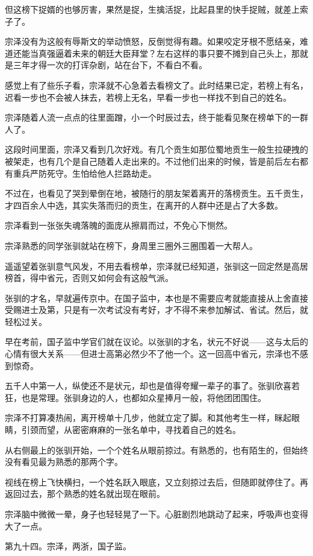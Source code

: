 但这榜下捉婿的也够厉害，果然是捉，生擒活捉，比起县里的快手捉贼，就差上索子了。

宗泽没有为这般有辱斯文的举动愤怒，反倒觉得有趣。如果咬定牙根不愿结亲，难道还能当真强逼着未来的朝廷大臣拜堂？左右这样的事只要不摊到自己头上，那就是三年才得一次的打诨杂剧，站在台下，不看白不看。

感觉上有了些乐子看，宗泽就不心急着去看榜文了。此时结果已定，若榜上有名，迟看一步也不会被人抹去，若榜上无名，早看一步也一样找不到自己的姓名。

宗泽随着人流一点点的往里面蹭，小一个时辰过去，终于能看见聚在榜单下的一群人了。

这段时间里面，宗泽又看到几次好戏。有几个贡生如那位蜀地贡生一般生拉硬拽的被架走，也有几个是自己随着人走出来的。不过他们出来的时候，皆是前后左右都有重兵严防死守。生怕给他人拦路劫走。

不过在，也看见了哭到晕倒在地，被随行的朋友架着离开的落榜贡生。五千贡生，才四百余人中选，其实失落而归的贡生，在离开的人群中还是占了大多数。

宗泽看到一张张失魂落魄的面庞从擦肩而过，不免心下恻然。

宗泽熟悉的同学张驯就站在榜下，身周里三圈外三圈围着一大帮人。

遥遥望着张驯意气风发，不用去看榜单，宗泽就已经知道，张驯这一回定然是高居榜首，得中省元，否则又如何会有这般气派。

张驯的才名，早就遍传京中。在国子监中，本也是不需要应考就能直接从上舍直接受赐进士及第，只是有一次考试没有考好，才不得不来参加解试、省试。然后，就轻松过关。

早在考前，国子监中学官们就在议论。以张驯的才名，状元不好说——这与太后的心情有很大关系——但进士高第必然少不了他一个。这一回高中省元，宗泽也不感到惊奇。

五千人中第一人，纵使还不是状元，却也是值得夸耀一辈子的事了。张驯欣喜若狂，也是常理。张驯身边的人，也都如众星捧月一般，将他团团围住。

宗泽不打算凑热闹，离开榜单十几步，他就立定了脚。和其他考生一样，眯起眼睛，引颈而望，从密密麻麻的一张名单中，寻找着自己的姓名。

从右侧最上的张驯开始，一个个姓名从眼前掠过。有熟悉的，也有陌生的，但始终没有看见最为熟悉的那两个字。

视线在榜上飞快横扫，一个姓名跃入眼底，又立刻掠过去后，但随即就停住了。再返回过去，那个熟悉的姓名就出现在眼前。

宗泽脑中微微一晕，身子也轻轻晃了一下。心脏剧烈地跳动了起来，呼吸声也变得大了一点。

第九十四。宗泽，两浙，国子监。

